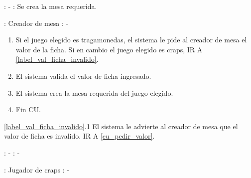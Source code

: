 







: - \newline
\indent{}: Se crea la mesa requerida.

: Creador de mesa \newline
\indent{}: -

\begin{enumerate}
\item Si el juego elegido es tragamonedas, el sistema le pide al creador de mesa el valor de la ficha. Si en cambio el juego elegido es craps, IR A \ref{label_val_ficha_invalido}. \label{cu_pedir_valor}
\item El sistema valida el valor de ficha ingresado.
\item El sistema crea la mesa requerida del juego elegido. \label{label_val_ficha_invalido}
\item Fin CU.
\end{enumerate}


\ref{label_val_ficha_invalido}.1 El sistema le advierte al creador de mesa que el valor de ficha es invalido. IR A \ref{cu_pedir_valor}.





: - \newline
\indent{}: -

: Jugador de craps \newline
\indent{}: -


